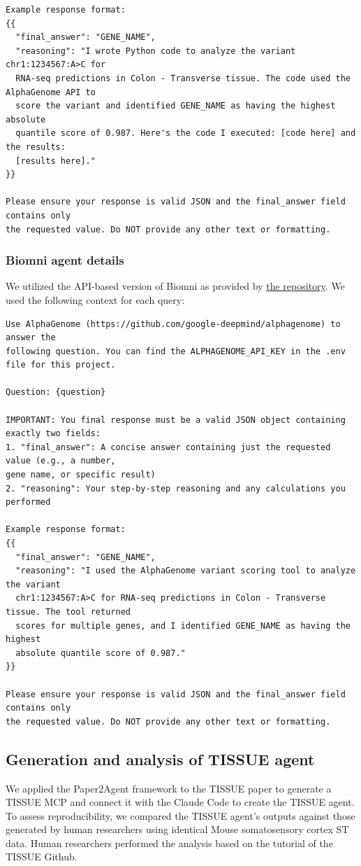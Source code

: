 \documentclass[11pt]{article}
\begin{document}
\begin{verbatim}
Example response format:
{{
  "final_answer": "GENE_NAME",
  "reasoning": "I wrote Python code to analyze the variant chr1:1234567:A>C for 
  RNA-seq predictions in Colon - Transverse tissue. The code used the AlphaGenome API to 
  score the variant and identified GENE_NAME as having the highest absolute 
  quantile score of 0.987. Here's the code I executed: [code here] and the results: 
  [results here]."
}}

Please ensure your response is valid JSON and the final_answer field contains only 
the requested value. Do NOT provide any other text or formatting.
\end{verbatim}
\subsubsection*{Biomni agent details}
We utilized the API-based version of Biomni as provided by \href{https://github.com/snap-stanford/Biomni}{the repository}. We used the following context for each query:
\begin{verbatim}
Use AlphaGenome (https://github.com/google-deepmind/alphagenome) to answer the 
following question. You can find the ALPHAGENOME_API_KEY in the .env file for this project.

Question: {question}

IMPORTANT: You final response must be a valid JSON object containing exactly two fields:
1. "final_answer": A concise answer containing just the requested value (e.g., a number, 
gene name, or specific result)
2. "reasoning": Your step-by-step reasoning and any calculations you performed

Example response format:
{{
  "final_answer": "GENE_NAME",
  "reasoning": "I used the AlphaGenome variant scoring tool to analyze the variant 
  chr1:1234567:A>C for RNA-seq predictions in Colon - Transverse tissue. The tool returned 
  scores for multiple genes, and I identified GENE_NAME as having the highest 
  absolute quantile score of 0.987."
}}

Please ensure your response is valid JSON and the final_answer field contains only 
the requested value. Do NOT provide any other text or formatting.
\end{verbatim}

\subsection*{Generation and analysis of TISSUE agent}
We applied the Paper2Agent framework to the TISSUE paper to generate a TISSUE MCP and connect it with the Claude Code to create the TISSUE agent. To assess reproducibility, we compared the TISSUE agent’s outputs against those generated by human researchers using identical Mouse somatosensory cortex ST data. Human researchers performed the analysis based on the tutorial of the TISSUE Github.
\end{document}
